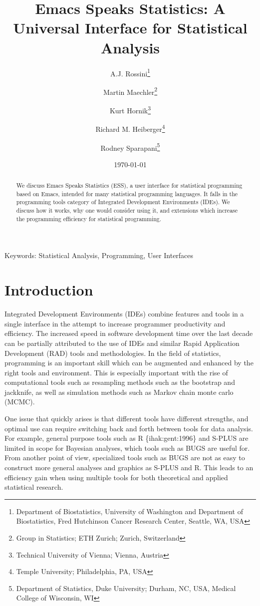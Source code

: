 \documentclass{article}
\title{Emacs Speaks Statistics: A Universal Interface for
  Statistical Analysis}
\author{A.J. Rossini\footnote{Department of Biostatistics, University
    of Washington and Department of Biostatistics, Fred Hutchinson
    Cancer Research Center, Seattle, WA, USA} \and Martin
  Maechler\footnote{Group  in Statistics; ETH Zurich; Zurich,
    Switzerland} \and Kurt 
  Hornik\footnote{Technical University of Vienna; Vienna, Austria} \and
  Richard M. Heiberger\footnote{Temple University; Philadelphia, PA,
    USA} \and Rodney Sparapani\footnote{Department of Statistics, Duke
    University; Durham, NC, USA, Medical College of Wisconsin, WI}}
\date{\today}
\newcommand{\citep}[1]{{\{\sf#1\}}}
\newif\ifpdf
\begin{document}
\ifpdf
  \DeclareGraphicsExtensions{.jpg,.pdf,.png,.mps}
\fi


\maketitle

Keywords: Statistical Analysis, Programming, User Interfaces

\begin{abstract}
  We discuss Emacs Speaks Statistics (ESS), a user interface for
  statistical programming based on Emacs, intended for many
  statistical programming languages.  It falls in the programming
  tools category of Integrated Development Environments (IDEs).  We
  discuss how it works, why one would consider using it, and
  extensions which increase the programming efficiency for statistical
  programming.
\end{abstract}

\section{Introduction}
\label{sec:intro}

Integrated Development Environments (IDEs) combine features and tools
in a single interface in the attempt to increase programmer
productivity and efficiency.  The increased speed in software
development time over the last decade can be partially attributed to
the use of IDEs and similar Rapid Application Development (RAD) tools
and methodologies.  In the field of statistics, programming is an
important skill which can be augmented and enhanced by the right tools
and environment.  This is especially important with the rise of
computational tools such as resampling methods such as the bootstrap
and jackknife, as well as simulation methods such as Markov chain
monte carlo (MCMC).  

One issue that quickly arises is that different tools have different
strengths, and optimal use can require switching back and forth
between tools for data analysis.  For example, general purpose tools
such as R \citep{ihak:gent:1996} and S-PLUS are limited in scope for
Bayesian analyses, which tools such as BUGS are useful for.  From
another point of view, specialized tools such as BUGS are not as easy
to construct more general analyses and graphics as S-PLUS and R.  This
leads to an efficiency gain when using multiple tools for both
theoretical and applied statistical research.
\end{document}
